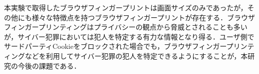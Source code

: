 \documentclass[10pt, a4paper]{jreport}
\begin{document}
本実験で取得したブラウザフィンガープリントは画面サイズのみであったが，その他にも様々な特徴点を持つブラウザフィンガープリントが存在する\cite{kind_of_fingerprints}\cite{canvas_fingerprinting}．ブラウザフィンガープリンティングはプライバシーの観点から脅威とされることも多いが，サイバー犯罪においては犯人を特定する有力な情報となり得る．ユーザ側でサードパーティCookieをブロックされた場合でも，ブラウザフィンガープリンティングなどを利用してサイバー犯罪の犯人を特定できるようにすることが，本研究の今後の課題である．

\end{document}
